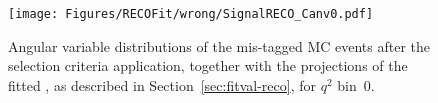 


\begin{figure}[!hbt]
  \centering
  \texttt{[image: Figures/RECOFit/wrong/SignalRECO\_Canv0.pdf]}
  \caption{Angular variable distributions of the mis-tagged MC events after the selection criteria application, together with the projections of the fitted \pdf, as described in Section~\ref{sec:fitval-reco}, for $q^2$ bin~0.}
  \label{fig:wtag-bin0}
\end{figure}



